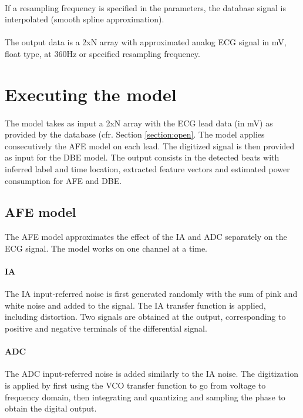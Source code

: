 \documentclass[a4paper,10pt,twoside]{article}
\begin{document}
\paragraph{} If a resampling frequency is specified in the parameters, the database signal is interpolated (smooth spline approximation). 

\paragraph{} The output data is a 2xN array with approximated analog ECG signal in mV, float type, at 360Hz or specified resampling frequency. 

\section{Executing the model}
\paragraph{} The model takes as input a 2xN array with the ECG lead data (in mV) as provided by the database (cfr. Section \ref{section:open}. The model applies consecutively the AFE model on each lead. The digitized signal is then provided as input for the DBE model. The output consists in the detected beats with inferred label and time location, extracted feature vectors and estimated power consumption for AFE and DBE. 

\subsection{AFE model}
The AFE model approximates the effect of the IA and ADC separately on the ECG signal. The model works on one channel at a time. 

\paragraph{IA} The IA input-referred noise is first generated randomly with the sum of pink and white noise and added to the signal. The IA transfer function is applied, including distortion. Two signals are obtained at the output, corresponding to positive and negative terminals of the differential signal. 

\paragraph{ADC} The ADC input-referred noise is added similarly to the IA noise. The digitization is applied by first using the VCO transfer function to go from voltage to frequency domain, then integrating and quantizing and sampling the phase to obtain the digital output. 
\end{document}
